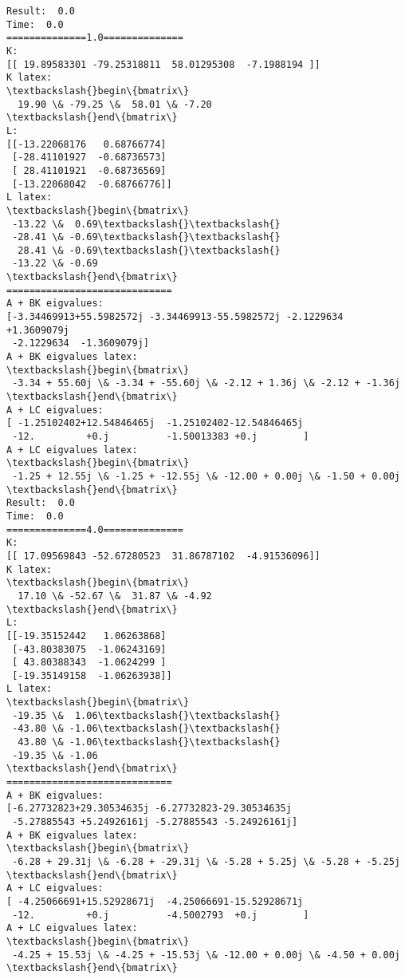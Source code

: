 \documentclass[11pt]{article}
\begin{document}
    \begin{Verbatim}[commandchars=\\\{\}]
Result:  0.0
Time:  0.0
==============1.0==============
K:
[[ 19.89583301 -79.25318811  58.01295308  -7.1988194 ]]
K latex:
\textbackslash{}begin\{bmatrix\}
  19.90 \& -79.25 \&  58.01 \& -7.20
\textbackslash{}end\{bmatrix\}
L:
[[-13.22068176   0.68766774]
 [-28.41101927  -0.68736573]
 [ 28.41101921  -0.68736569]
 [-13.22068042  -0.68766776]]
L latex:
\textbackslash{}begin\{bmatrix\}
 -13.22 \&  0.69\textbackslash{}\textbackslash{}
 -28.41 \& -0.69\textbackslash{}\textbackslash{}
  28.41 \& -0.69\textbackslash{}\textbackslash{}
 -13.22 \& -0.69
\textbackslash{}end\{bmatrix\}
=============================
A + BK eigvalues:
[-3.34469913+55.5982572j -3.34469913-55.5982572j -2.1229634  +1.3609079j
 -2.1229634  -1.3609079j]
A + BK eigvalues latex:
\textbackslash{}begin\{bmatrix\}
 -3.34 + 55.60j \& -3.34 + -55.60j \& -2.12 + 1.36j \& -2.12 + -1.36j
\textbackslash{}end\{bmatrix\}
A + LC eigvalues:
[ -1.25102402+12.54846465j  -1.25102402-12.54846465j
 -12.         +0.j          -1.50013383 +0.j        ]
A + LC eigvalues latex:
\textbackslash{}begin\{bmatrix\}
 -1.25 + 12.55j \& -1.25 + -12.55j \& -12.00 + 0.00j \& -1.50 + 0.00j
\textbackslash{}end\{bmatrix\}
Result:  0.0
Time:  0.0
==============4.0==============
K:
[[ 17.09569843 -52.67280523  31.86787102  -4.91536096]]
K latex:
\textbackslash{}begin\{bmatrix\}
  17.10 \& -52.67 \&  31.87 \& -4.92
\textbackslash{}end\{bmatrix\}
L:
[[-19.35152442   1.06263868]
 [-43.80383075  -1.06243169]
 [ 43.80388343  -1.0624299 ]
 [-19.35149158  -1.06263938]]
L latex:
\textbackslash{}begin\{bmatrix\}
 -19.35 \&  1.06\textbackslash{}\textbackslash{}
 -43.80 \& -1.06\textbackslash{}\textbackslash{}
  43.80 \& -1.06\textbackslash{}\textbackslash{}
 -19.35 \& -1.06
\textbackslash{}end\{bmatrix\}
=============================
A + BK eigvalues:
[-6.27732823+29.30534635j -6.27732823-29.30534635j
 -5.27885543 +5.24926161j -5.27885543 -5.24926161j]
A + BK eigvalues latex:
\textbackslash{}begin\{bmatrix\}
 -6.28 + 29.31j \& -6.28 + -29.31j \& -5.28 + 5.25j \& -5.28 + -5.25j
\textbackslash{}end\{bmatrix\}
A + LC eigvalues:
[ -4.25066691+15.52928671j  -4.25066691-15.52928671j
 -12.         +0.j          -4.5002793  +0.j        ]
A + LC eigvalues latex:
\textbackslash{}begin\{bmatrix\}
 -4.25 + 15.53j \& -4.25 + -15.53j \& -12.00 + 0.00j \& -4.50 + 0.00j
\textbackslash{}end\{bmatrix\}
    \end{Verbatim}

    \begin{center}
    \end{center}
    { \hspace*{\fill} \\}
    
\end{document}
